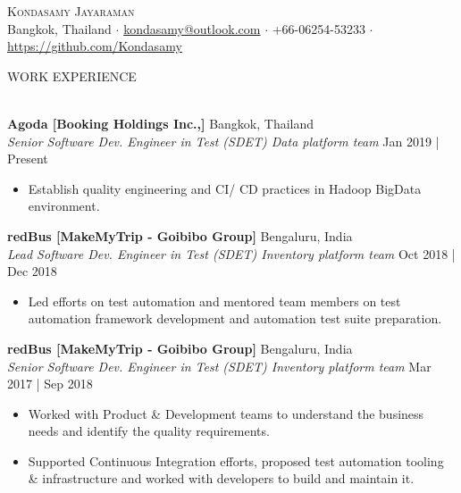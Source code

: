 \documentclass[a4paper]{article}
\newcommand{\lineunder} {
    \vspace*{-8pt} \\
    \hspace*{-18pt} \hrulefill \\
}
\newcommand{\header} [1] {
    {\hspace*{-18pt}\vspace*{6pt} \textsc{#1}}
    \vspace*{-6pt} \lineunder
}
\begin{document}
\vspace*{-50pt}

    

\vspace*{-10pt}
\begin{center}
	{\Huge \scshape {Kondasamy Jayaraman}}\\
	Bangkok, Thailand $\cdot$ \underline{kondasamy@outlook.com} $\cdot$ +66-06254-53233 $\cdot$ \underline{https://github.com/Kondasamy}\\
\end{center}

\header{WORK EXPERIENCE}
\vspace{1mm}

\textbf{Agoda [Booking Holdings Inc.,]} \hfill Bangkok, Thailand\\
\textit{Senior Software Dev. Engineer in Test (SDET) \textbar{} Data platform team} \hfill Jan 2019 | Present\\
\vspace{-1.5mm}
\begin{itemize} \itemsep 1pt
	\item Establish quality engineering and CI/ CD practices in Hadoop BigData environment.
\end{itemize}

\textbf{redBus [MakeMyTrip - Goibibo Group]} \hfill Bengaluru, India\\
\textit{Lead Software Dev. Engineer in Test (SDET) \textbar{} Inventory platform team} \hfill Oct 2018 | Dec 2018\\
\vspace{-1.5mm}
\begin{itemize} \itemsep 1pt
	\item Led efforts on test automation and mentored team members on test automation framework development and automation test suite preparation.
\end{itemize}

\textbf{redBus [MakeMyTrip - Goibibo Group]} \hfill Bengaluru, India\\
\textit{Senior Software Dev. Engineer in Test (SDET) \textbar{} Inventory platform team} \hfill Mar 2017 | Sep 2018\\
\vspace{-1.5mm}
\begin{itemize} \itemsep 1pt
	\item Worked with Product \& Development teams to understand the business needs and identify the quality requirements.
	\item Supported Continuous Integration efforts, proposed test automation tooling \& infrastructure and worked with developers to build and maintain it.
\end{itemize}
\end{document}
